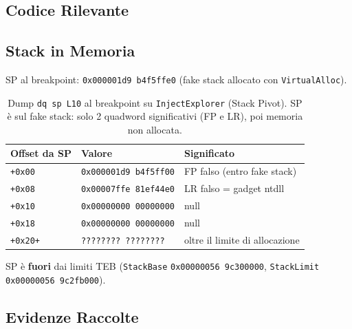 \subsection{Codice Rilevante}





\subsection{Stack in Memoria}

SP al breakpoint: \texttt{0x000001d9\,b4f5ffe0}
(fake stack allocato con \texttt{VirtualAlloc}).

\begin{table}[H]
\centering
\begin{tabular}{lll}
\toprule
Offset da SP & Valore & Significato \\
\midrule
\texttt{+0x00} & \texttt{0x000001d9\,b4f5ff00} & FP falso (entro fake stack) \\
\texttt{+0x08} & \texttt{0x00007ffe\,81ef44e0} & LR falso = gadget ntdll \\
\texttt{+0x10} & \texttt{0x00000000\,00000000} & null \\
\texttt{+0x18} & \texttt{0x00000000\,00000000} & null \\
\texttt{+0x20+} & \texttt{????????\,????????} & oltre il limite di allocazione \\
\bottomrule
\end{tabular}
\caption{Dump \texttt{dq sp L10} al breakpoint su \texttt{InjectExplorer}
         (Stack Pivot). SP è sul fake stack: solo 2 quadword
         significativi (FP e LR), poi memoria non allocata.}
\label{tab:sc4-stack}
\end{table}

{\sloppy SP è \textbf{fuori} dai limiti TEB
(\texttt{StackBase} \texttt{0x00000056\,9c300000},
\texttt{StackLimit} \texttt{0x00000056\,9c2fb000}).\par}

\subsection{Evidenze Raccolte}

